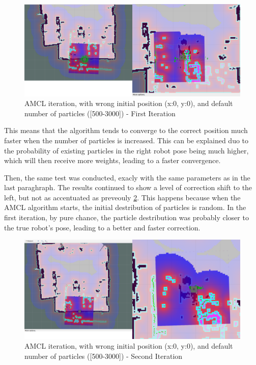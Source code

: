 \begin{figure}
    \centering
    \includegraphics[width=1\linewidth]{AMCL iteration, (x -1, y -1)-([500-3000])(1).png}
    \caption{AMCL iteration, with wrong initial position (x:0, y:0), and default number of particles ([500-3000]) - First Iteration}
    \label{fig:amcl-lab-rosbag--1--1-1000-6000 - first iter}
\end{figure}

This means that the algorithm tends to converge to the correct position much faster when the number of particles is increased. This can be explained duo to the probability of existing particles in the right robot pose being much higher, which will then receive more weights, leading to a faster convergence.

Then, the same test was conducted, exacly with the same parameters as in the last paraghraph. The results continued to show a level of correction shift to the left, but not as accentuated as preveouly \ref{fig:amcl-lab-rosbag--1--1-1000-6000 - second iter}. 
This happens because when the AMCL algorithm starts, the initial destribution of particles is random. In the first iteration, by pure chance, the particle destribution was probably closer to the true robot's pose, leading to a better and faster correction. 

\begin{figure}
    \centering
    \includegraphics[width=1\linewidth]{amcl-lab-rosbag--1--1-1000-6000.png}
    \caption{AMCL iteration, with wrong initial position (x:0, y:0), and default number of particles ([500-3000]) - Second Iteration}
    \label{fig:amcl-lab-rosbag--1--1-1000-6000 - second iter}
\end{figure}

